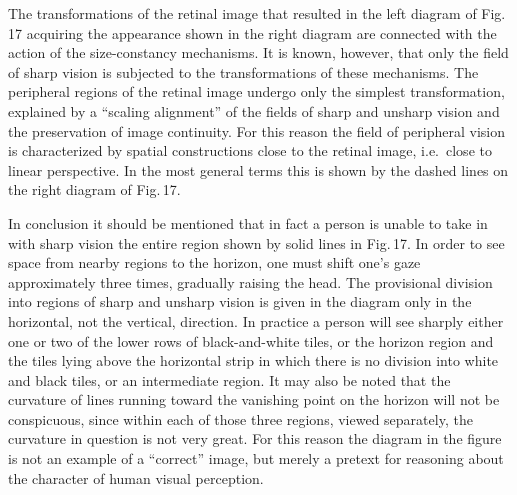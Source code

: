 The transformations of the retinal image that resulted in the left diagram of Fig.\,17
acquiring the appearance shown in the right diagram are connected with the action of
the size-constancy mechanisms.  It is known, however, that only the field of sharp vision
is subjected to the transformations of these mechanisms.  The peripheral regions of the
retinal image undergo only the simplest transformation, explained by a ``scaling
alignment'' of the fields of sharp and unsharp vision and the preservation of image
continuity.  For this reason the field of peripheral vision is characterized by spatial
constructions close to the retinal image, i.e.\ close to linear perspective.  In the most
general terms this is shown by the dashed lines on the right diagram of Fig.\,17.


In conclusion it should be mentioned that in fact a person is unable to take in with
sharp vision the entire region shown by solid lines in Fig.\,17.  In order to see space
from nearby regions to the horizon, one must shift one's gaze approximately three times,
gradually raising the head.  The provisional division into regions of sharp and unsharp
vision is given in the diagram only in the horizontal, not the vertical, direction.  In
practice a person will see sharply either one or two of the lower rows of black-and-white
tiles, or the horizon region and the tiles lying above the horizontal strip in which there
is no division into white and black tiles, or an intermediate region.  It may also be
noted that the curvature of lines running toward the vanishing point on the horizon will
not be conspicuous, since within each of those three regions, viewed separately, the
curvature in question is not very great.  For this reason the diagram in the figure is not
an example of a ``correct'' image, but merely a pretext for reasoning about the character
of human visual perception.


